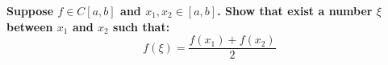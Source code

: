 \item \textbf{
    Suppose $f\in C[a,b]$ and $x_1,x_2 \in [a,b]$. Show that exist a number $\xi$ between $x_1$ and $x_2$ such that:
    \begin{equation*}
        f(\xi) = \frac{f(x_1)+f(x_2)}{2}
    \end{equation*}
}